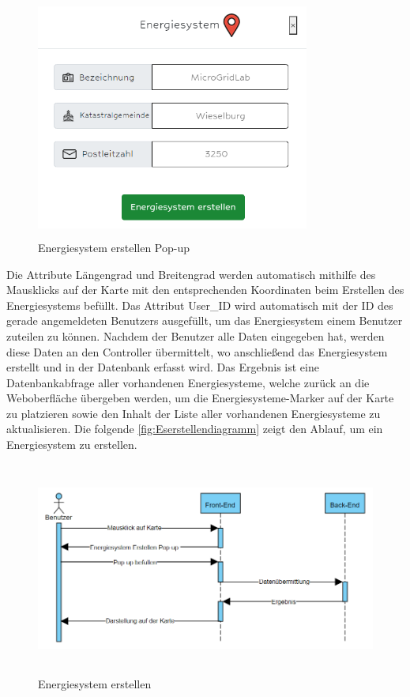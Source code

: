 \begin{figure}[h]
	\centering
	\includegraphics[height=8cm,width=9cm]{images/ESerstellenPop}
	\caption{Energiesystem erstellen Pop-up}
	\label{fig:ESerstellenPopup}
\end{figure}
\newpage
Die Attribute Längengrad und Breitengrad werden automatisch mithilfe des Mausklicks auf der Karte mit den entsprechenden Koordinaten beim Erstellen des Energiesystems befüllt. Das Attribut User\_ID wird automatisch mit der ID des gerade angemeldeten Benutzers ausgefüllt, um das Energiesystem einem Benutzer zuteilen zu können.
\newline
Nachdem der Benutzer alle Daten eingegeben hat, werden diese Daten an den Controller übermittelt, wo anschließend das Energiesystem erstellt und in der Datenbank erfasst wird. Das Ergebnis ist eine Datenbankabfrage aller vorhandenen Energiesysteme, welche zurück an die Weboberfläche übergeben werden, um die Energiesysteme-Marker auf der Karte zu platzieren sowie den Inhalt der Liste aller vorhandenen Energiesysteme zu aktualisieren.  
Die folgende \autoref{fig:Eserstellendiagramm} zeigt den Ablauf, um ein Energiesystem zu erstellen.

\begin{figure}[h]
	\centering
	\includegraphics[height=7cm,width=14cm]{images/ESerstellen}
	\caption{Energiesystem erstellen}
	\label{fig:Eserstellendiagramm}
\end{figure}





